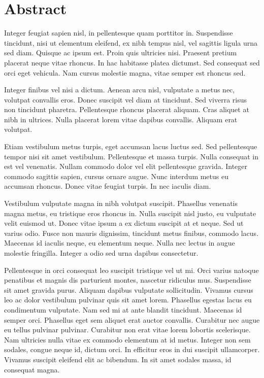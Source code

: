 \documentclass[titlepage,twoside,onecolumn,a4paper,11pt]{report}
\begin{document}
\cleardoublepage

\chapter*{Abstract}
\fancyhead[RO,LE]{\thepage}

Integer feugiat sapien nisl, in pellentesque quam porttitor in. Suspendisse tincidunt, nisi ut elementum eleifend, ex nibh tempus nisl, vel sagittis ligula urna sed diam. Quisque ac ipsum est. Proin quis ultricies nisi. Praesent pretium placerat neque vitae rhoncus. In hac habitasse platea dictumst. Sed consequat sed orci eget vehicula. Nam cursus molestie magna, vitae semper est rhoncus sed.

Integer finibus vel nisi a dictum. Aenean arcu nisl, vulputate a metus nec, volutpat convallis eros. Donec suscipit vel diam at tincidunt. Sed viverra risus non tincidunt pharetra. Pellentesque rhoncus placerat aliquam. Cras aliquet at nibh in ultrices. Nulla placerat lorem vitae dapibus convallis. Aliquam erat volutpat.

Etiam vestibulum metus turpis, eget accumsan lacus luctus sed. Sed pellentesque tempor nisi sit amet vestibulum. Pellentesque et massa turpis. Nulla consequat in est vel venenatis. Nullam commodo dolor vel elit pellentesque gravida. Integer commodo sagittis sapien, cursus ornare augue. Nunc interdum metus eu accumsan rhoncus. Donec vitae feugiat turpis. In nec iaculis diam.

Vestibulum vulputate magna in nibh volutpat suscipit. Phasellus venenatis magna metus, eu tristique eros rhoncus in. Nulla suscipit nisl justo, eu vulputate velit euismod ut. Donec vitae ipsum a ex dictum suscipit at et neque. Sed ut varius odio. Fusce non mauris dignissim, tincidunt metus finibus, commodo lacus. Maecenas id iaculis neque, eu elementum neque. Nulla nec lectus in augue molestie fringilla. Integer a odio sed urna dapibus consectetur.

Pellentesque in orci consequat leo suscipit tristique vel ut mi. Orci varius natoque penatibus et magnis dis parturient montes, nascetur ridiculus mus. Suspendisse sit amet gravida purus. Aliquam dapibus vulputate sollicitudin. Vivamus cursus leo ac dolor vestibulum pulvinar quis sit amet lorem. Phasellus egestas lacus eu condimentum vulputate. Nam sed mi at ante blandit tincidunt. Maecenas id semper orci. Phasellus eget sem aliquet erat auctor convallis. Curabitur nec augue eu tellus pulvinar pulvinar. Curabitur non erat vitae lorem lobortis scelerisque. Nam ultricies nulla vitae ex commodo elementum at id metus. Integer non sem sodales, congue neque id, dictum orci. In efficitur eros in dui suscipit ullamcorper. Vivamus suscipit eleifend elit ac bibendum. In sit amet sodales massa, id consequat magna.
\end{document}
